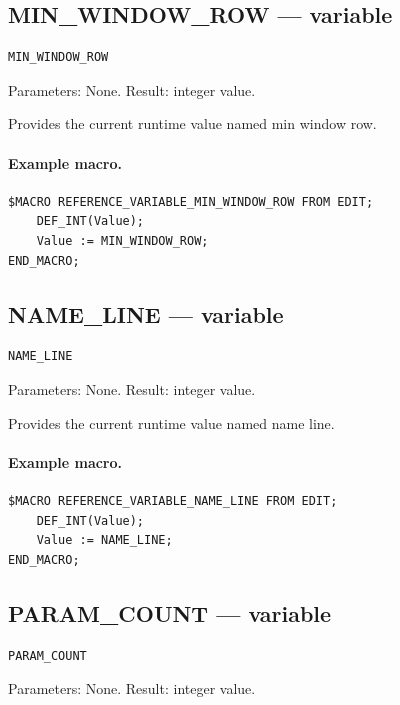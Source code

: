 \documentclass[a4paper,10pt,twoside,openany]{book}
\begin{document}
\label{prim:variable-min-window-row}
\subsection*{MIN\_WINDOW\_ROW --- variable}
\begin{verbatim}
MIN_WINDOW_ROW
\end{verbatim}
Parameters: None. Result: integer value.

Provides the current runtime value named min window row.

\paragraph{Example macro.}
\begin{verbatim}
$MACRO REFERENCE_VARIABLE_MIN_WINDOW_ROW FROM EDIT;
    DEF_INT(Value);
    Value := MIN_WINDOW_ROW;
END_MACRO;
\end{verbatim}

\label{prim:variable-name-line}
\subsection*{NAME\_LINE --- variable}
\begin{verbatim}
NAME_LINE
\end{verbatim}
Parameters: None. Result: integer value.

Provides the current runtime value named name line.

\paragraph{Example macro.}
\begin{verbatim}
$MACRO REFERENCE_VARIABLE_NAME_LINE FROM EDIT;
    DEF_INT(Value);
    Value := NAME_LINE;
END_MACRO;
\end{verbatim}

\label{prim:variable-param-count}
\subsection*{PARAM\_COUNT --- variable}
\begin{verbatim}
PARAM_COUNT
\end{verbatim}
Parameters: None. Result: integer value.
\end{document}

